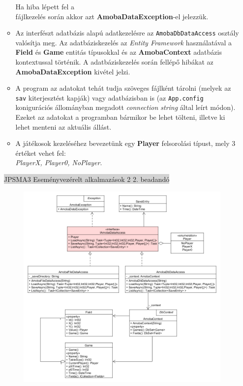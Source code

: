 \documentclass[11pt,a4paper]{article}
\begin{document}
\begin{itemize}
\begin{itemize}
		Ha hiba lépett fel a\\fájlkezelés során akkor azt \textbf{AmobaDataException}-el jelezzük.
		\item Az interfészt adatbázis alapú adatkezelésre az \verb|AmobaDbDataAccess| osztály
		valósítja meg. Az adatbáziskezelés az \textit{Entity Framework} használatával a
		\textbf{Field} és \textbf{Game} entitás típusokkal és az \textbf{AmobaContext}
		adatbázis kontextussal történik. A adatbáziskezelés során fellépő hibákat az
		\textbf{AmobaDataException} kivétel jelzi.
		\item A program az adatokat tehát tudja szöveges fájlként tárolni (melyek az \verb|sav|
		kiterjesztést kapják) vagy adatbázisban is (az \verb|App.config| konigurációs állományban
		megadott \textit{connection string} által leírt módon). Ezeket az adatokat a programban
		bármikor be lehet tölteni, illetve ki lehet menteni az aktuális állást.
		\item A játékosok kezeléséhez bevezetünk egy \textbf{Player} felsorolási típust, mely
		3 értéket vehet fel:\\ \textit{PlayerX, Player0, NoPlayer}.
	\end{itemize}
	\newpage
	\thispagestyle{empty}
	\begin{center}
		\colorbox{lightgray}{{\large JPSMA3} \hspace{3cm} {\large Eseményvezérelt alkalmazások 2 2. beadandó} \hspace{5cm} \thepage}
	\end{center}
	\begin{figure}[h]
		\centering
		\includegraphics[width=17cm]{UMLs/PersistenceClass.png}

\end{figure}
\end{itemize}
\end{document}
